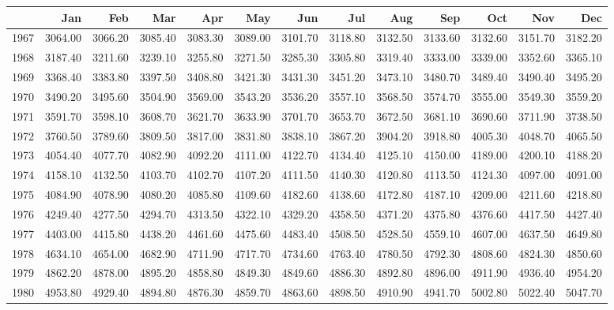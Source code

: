 \begin{longtable}{rrrrrrrrrrrrr}
  \hline
 & Jan & Feb & Mar & Apr & May & Jun & Jul & Aug & Sep & Oct & Nov & Dec \\ 
  \hline
1967 & 3064.00 & 3066.20 & 3085.40 & 3083.30 & 3089.00 & 3101.70 & 3118.80 & 3132.50 & 3133.60 & 3132.60 & 3151.70 & 3182.20 \\ 
  1968 & 3187.40 & 3211.60 & 3239.10 & 3255.80 & 3271.50 & 3285.30 & 3305.80 & 3319.40 & 3333.00 & 3339.00 & 3352.60 & 3365.10 \\ 
  1969 & 3368.40 & 3383.80 & 3397.50 & 3408.80 & 3421.30 & 3431.30 & 3451.20 & 3473.10 & 3480.70 & 3489.40 & 3490.40 & 3495.20 \\ 
  1970 & 3490.20 & 3495.60 & 3504.90 & 3569.00 & 3543.20 & 3536.20 & 3557.10 & 3568.50 & 3574.70 & 3555.00 & 3549.30 & 3559.20 \\ 
  1971 & 3591.70 & 3598.10 & 3608.70 & 3621.70 & 3633.90 & 3701.70 & 3653.70 & 3672.50 & 3681.10 & 3690.60 & 3711.90 & 3738.50 \\ 
  1972 & 3760.50 & 3789.60 & 3809.50 & 3817.00 & 3831.80 & 3838.10 & 3867.20 & 3904.20 & 3918.80 & 4005.30 & 4048.70 & 4065.50 \\ 
  1973 & 4054.40 & 4077.70 & 4082.90 & 4092.20 & 4111.00 & 4122.70 & 4134.40 & 4125.10 & 4150.00 & 4189.00 & 4200.10 & 4188.20 \\ 
  1974 & 4158.10 & 4132.50 & 4103.70 & 4102.70 & 4107.20 & 4111.50 & 4140.30 & 4120.80 & 4113.50 & 4124.30 & 4097.00 & 4091.00 \\ 
  1975 & 4084.90 & 4078.90 & 4080.20 & 4085.80 & 4109.60 & 4182.60 & 4138.60 & 4172.80 & 4187.10 & 4209.00 & 4211.60 & 4218.80 \\ 
  1976 & 4249.40 & 4277.50 & 4294.70 & 4313.50 & 4322.10 & 4329.20 & 4358.50 & 4371.20 & 4375.80 & 4376.60 & 4417.50 & 4427.40 \\ 
  1977 & 4403.00 & 4415.80 & 4438.20 & 4461.60 & 4475.60 & 4483.40 & 4508.50 & 4528.50 & 4559.10 & 4607.00 & 4637.50 & 4649.80 \\ 
  1978 & 4634.10 & 4654.00 & 4682.90 & 4711.90 & 4717.70 & 4734.60 & 4763.40 & 4780.50 & 4792.30 & 4808.60 & 4824.30 & 4850.60 \\ 
  1979 & 4862.20 & 4878.00 & 4895.20 & 4858.80 & 4849.30 & 4849.60 & 4886.30 & 4892.80 & 4896.00 & 4911.90 & 4936.40 & 4954.20 \\ 
  1980 & 4953.80 & 4929.40 & 4894.80 & 4876.30 & 4859.70 & 4863.60 & 4898.50 & 4910.90 & 4941.70 & 5002.80 & 5022.40 & 5047.70 \\ 

\end{longtable}
